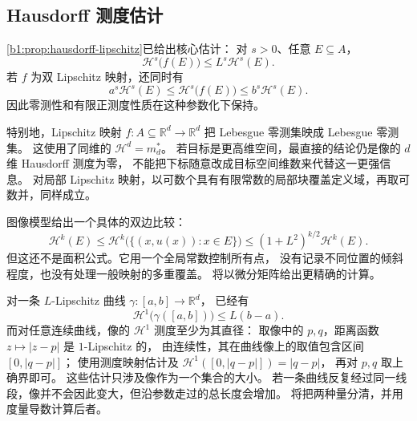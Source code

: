 \subsection{Hausdorff 测度估计}
\label{b1:subsec:160104}

\cref{b1:prop:hausdorff-lipschitz}已给出核心估计：
对 \(s>0\)、任意 \(E\subseteq A\)，
\[
 \mathcal H^s\bigl(f(E)\bigr)\leq L^s\mathcal H^s(E).
\]
若 \(f\) 为双 Lipschitz 映射，还同时有
\[
 a^s\mathcal H^s(E)\leq\mathcal H^s\bigl(f(E)\bigr)
 \leq b^s\mathcal H^s(E).
\]
因此零测性和有限正测度性质在这种参数化下保持。

\ProseParagraphBreak

特别地，Lipschitz 映射 \(f:A\subseteq\mathbb R^d\rightarrow\mathbb R^d\)
把 Lebesgue 零测集映成 Lebesgue 零测集。
这使用了同维的 \(\mathcal H^d=m_d^*\)。
若目标是更高维空间，最直接的结论仍是像的 \(d\) 维 Hausdorff 测度为零，
不能把下标随意改成目标空间维数来代替这一更强信息。
对局部 Lipschitz 映射，以可数个具有有限常数的局部块覆盖定义域，再取可数并，同样成立。

\ProseParagraphBreak

图像模型给出一个具体的双边比较：
\[
 \mathcal H^k(E)\leq
 \mathcal H^k\bigl(\{(x,u(x)):x\in E\}\bigr)
 \leq(1+L^2)^{k/2}\mathcal H^k(E).
\]
但这还不是面积公式。它用一个全局常数控制所有点，
没有记录不同位置的倾斜程度，也没有处理一般映射的多重覆盖。
将以微分矩阵给出更精确的计算。

\ProseParagraphBreak

对一条 \(L\)-Lipschitz 曲线 \(\gamma:[a,b]\rightarrow\mathbb R^d\)，
已经有
\[
 \mathcal H^1\bigl(\gamma([a,b])\bigr)\leq L(b-a).
\]
而对任意连续曲线，像的 \(\mathcal H^1\) 测度至少为其直径：
取像中的 \(p,q\)，距离函数 \(z\mapsto|z-p|\) 是 \(1\)-Lipschitz 的，
由连续性，其在曲线像上的取值包含区间 \([0,|q-p|]\)；
使用测度映射估计及 \(\mathcal H^1([0,|q-p|])=|q-p|\)，
再对 \(p,q\) 取上确界即可。
这些估计只涉及像作为一个集合的大小。
若一条曲线反复经过同一线段，像并不会因此变大，但沿参数走过的总长度会增加。
将把两种量分清，并用度量导数计算后者。
